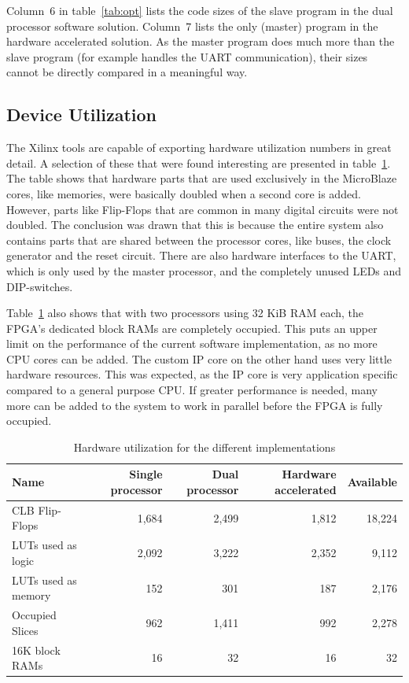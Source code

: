 \documentclass[11pt]{article}
\begin{document}
Column~6 in table~\ref{tab:opt} lists the code sizes of the slave program in the dual processor software solution. Column~7 lists the only (master) program in the hardware accelerated solution. As the master program does much more than the slave program (for example handles the UART communication), their sizes cannot be directly compared in a meaningful way.

\subsection{Device Utilization}
The Xilinx tools are capable of exporting hardware utilization numbers in great detail. A selection of these that were found interesting are presented in table~\ref{tab:Utilization}. The table shows that hardware parts that are used exclusively in the MicroBlaze cores, like memories, were basically doubled when a second core is added. However, parts like Flip-Flops that are common in many digital circuits were not doubled. The conclusion was drawn that this is because the entire system also contains parts that are shared between the processor cores, like buses, the clock generator and the reset circuit. There are also hardware interfaces to the UART, which is only used by the master processor, and the completely unused LEDs and DIP-switches.

Table~\ref{tab:Utilization} also shows that with two processors using 32 KiB RAM each, the FPGA's dedicated block RAMs are completely occupied. This puts an upper limit on the performance of the current software implementation, as no more CPU cores can be added. The custom IP core on the other hand uses very little hardware resources. This was expected, as the IP core is very application specific compared to a general purpose CPU. If greater performance is needed, many more can be added to the system to work in parallel before the FPGA is fully occupied.

\begin{table}
  \centering
  \begin{tabular}{lrrrr}
    \toprule
    Name & Single processor & Dual processor & Hardware accelerated & Available \\
    \midrule
    CLB Flip-Flops & 1,684 & 2,499 & 1,812 & 18,224 \\ %
    LUTs used as logic & 2,092 & 3,222 & 2,352 & 9,112 \\
    LUTs used as memory & 152 & 301 & 187 & 2,176 \\ %
    Occupied Slices & 962 & 1,411 & 992 & 2,278 \\
    16K block RAMs & 16 & 32 & 16 & 32 \\
    \bottomrule
  \end{tabular}
  \caption{Hardware utilization for the different implementations}
  \label{tab:Utilization}
\end{table}
\end{document}
